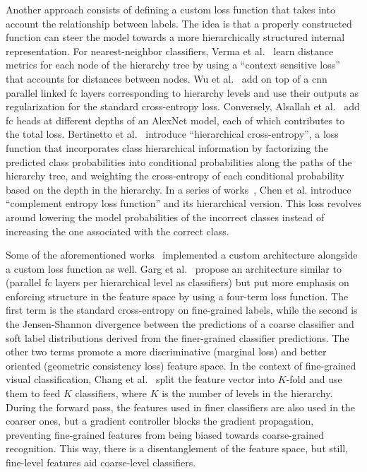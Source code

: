 Another approach consists of defining a custom loss function that takes into
account the relationship between labels. The idea is that a properly
constructed function can steer the model towards a more hierarchically
structured internal representation. For nearest-neighbor classifiers, Verma et
al.~\cite{LearningHierarVerma2012} learn distance metrics for each node of the
hierarchy tree by using a ``context sensitive loss'' that accounts for
distances between nodes. Wu et al.~\cite{LearningToMakWuHu2016} add on top of a
\acrshort{cnn} parallel linked \acrshort{fc} layers corresponding to hierarchy
levels and use their outputs as regularization for the standard cross-entropy
loss. Conversely, Alsallah et al.~\cite{DoConvolutionaAlsall2017} add
\acrshort{fc} heads at different depths of an AlexNet model, each of which
contributes to the total loss. Bertinetto et al.~\cite{MakingBetterMBertin2019}
introduce ``hierarchical cross-entropy'', a loss function that incorporates
class hierarchical information by factorizing the predicted class probabilities
into conditional probabilities along the paths of the hierarchy tree, and
weighting the cross-entropy of each conditional probability based on the depth
in the hierarchy. In a series of works~\cite{ComplementObjeChen2019,
ImprovingAdverChen2019, LearningWithHChen2019}, Chen et al. introduce
``complement entropy loss function'' and its hierarchical version. This loss
revolves around lowering the model probabilities of the incorrect classes
instead of increasing the one associated with the correct class.

Some of the aforementioned works~\cite{LearningToMakWuHu2016,
DoConvolutionaAlsall2017} implemented a custom architecture alongside a custom
loss function as well. Garg et al.~\cite{LearningHierarGarg2022} propose an
architecture similar to~\cite{LearningToMakWuHu2016} (parallel \acrshort{fc}
layers per hierarchical level as classifiers) but put more emphasis on
enforcing structure in the feature space by using a four-term loss function.
The first term is the standard cross-entropy on fine-grained labels, while the
second is the Jensen-Shannon divergence between the predictions of a coarse
classifier and soft label distributions derived from the finer-grained
classifier predictions. The other two terms promote a more discriminative
(marginal loss) and better oriented (geometric consistency loss) feature space.
In the context of fine-grained visual classification, Chang et
al.~\cite{YourFlamingoChang2020} split the feature vector into $K$-fold and use
them to feed $K$ classifiers, where $K$ is the number of levels in the
hierarchy. During the forward pass, the features used in finer classifiers are
also used in the coarser ones, but a gradient controller blocks the gradient
propagation, preventing fine-grained features from being biased towards
coarse-grained recognition. This way, there is a disentanglement of the feature
space, but still, fine-level features aid coarse-level classifiers.

